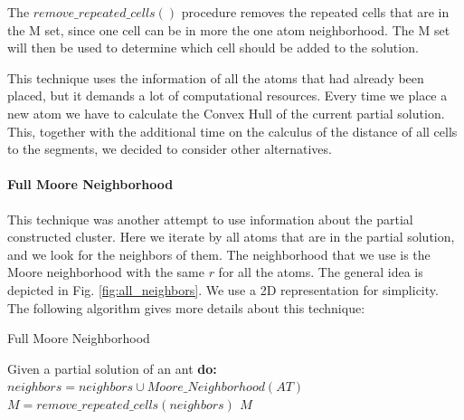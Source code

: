 			The $remove\_repeated\_cells()$ procedure removes the repeated cells that are in the M set, since one cell can be in more the one atom neighborhood.
			The M set will then be used to determine which cell should be added to the solution.

			This technique uses the information of all the atoms that had already been placed, but it demands a lot of computational resources. Every time we place a new atom we have to calculate the Convex Hull of the current partial solution. This, together with the additional time on the calculus of the distance of all cells to the segments, we decided to consider other alternatives.
			
			\paragraph*{Full Moore Neighborhood}
			This technique was another attempt to use information about the partial constructed cluster. Here we iterate by all atoms that are in the partial solution, and we look for the neighbors of them. The neighborhood that we use is the Moore neighborhood with the same $r$ for all the atoms. The general idea is depicted in Fig. \ref{fig:all_neighbors}. We use a 2D representation for simplicity. The following algorithm gives more details about this technique:
		
			\begin{algorithm}
				\caption{Full Moore Neighborhood}
				\label{alg:all_atom_neighbors}
				\begin{algorithmic}
				\STATE Given a partial solution of an ant \bf{do}:
						\STATE $neighbors = neighbors \cup Moore\_Neighborhood(AT)$
					\ENDFOR
				\ENDFOR
				\STATE $M = remove\_repeated\_cells(neighbors)$
				\RETURN $M$
				\end{algorithmic}
			\end{algorithm}
		
		
		
